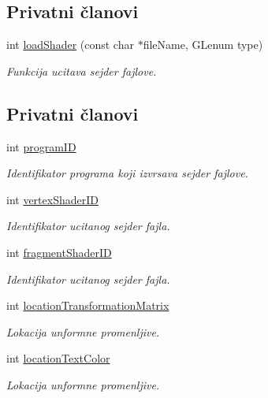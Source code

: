 \subsection*{Privatni članovi}
\begin{DoxyCompactItemize}
\item 
int \hyperlink{classshader_1_1FontShader_abe3a0b4d642aa405ec8e27cf10c8543b}{load\+Shader} (const char $\ast$file\+Name, G\+Lenum type)
\begin{DoxyCompactList}\small\item\em Funkcija ucitava sejder fajlove. \end{DoxyCompactList}\end{DoxyCompactItemize}
\subsection*{Privatni članovi}
\begin{DoxyCompactItemize}
\item 
int \hyperlink{classshader_1_1FontShader_a5836d121dcb745fc151a76416ed82287}{program\+ID}
\begin{DoxyCompactList}\small\item\em Identifikator programa koji izvrsava sejder fajlove. \end{DoxyCompactList}\item 
int \hyperlink{classshader_1_1FontShader_aa685de6b436e9d1a0bd0904e673ac035}{vertex\+Shader\+ID}
\begin{DoxyCompactList}\small\item\em Identifikator ucitanog sejder fajla. \end{DoxyCompactList}\item 
int \hyperlink{classshader_1_1FontShader_a502033bcf071a692c5373949325d51d8}{fragment\+Shader\+ID}
\begin{DoxyCompactList}\small\item\em Identifikator ucitanog sejder fajla. \end{DoxyCompactList}\item 
int \hyperlink{classshader_1_1FontShader_ae865d1cb3d301993b5d1b27956c8b923}{location\+Transformation\+Matrix}
\begin{DoxyCompactList}\small\item\em Lokacija unformne promenljive. \end{DoxyCompactList}\item 
int \hyperlink{classshader_1_1FontShader_aeb4b26824dcb51dc7ba11f8a3df018e6}{location\+Text\+Color}
\begin{DoxyCompactList}\small\item\em Lokacija unformne promenljive. \end{DoxyCompactList}\end{DoxyCompactItemize}


